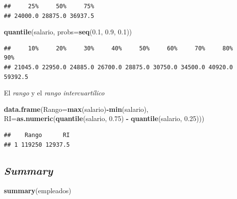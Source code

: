 \documentclass[]{book}
\newenvironment{Shaded}{\begin{snugshade}}{\end{snugshade}}
\newcommand{\DataTypeTok}[1]{\textcolor[rgb]{0.13,0.29,0.53}{#1}}
\newcommand{\FloatTok}[1]{\textcolor[rgb]{0.00,0.00,0.81}{#1}}
\newcommand{\KeywordTok}[1]{\textcolor[rgb]{0.13,0.29,0.53}{\textbf{#1}}}
\newcommand{\NormalTok}[1]{#1}
\newcommand{\OperatorTok}[1]{\textcolor[rgb]{0.81,0.36,0.00}{\textbf{#1}}}
\newcommand{\StringTok}[1]{\textcolor[rgb]{0.31,0.60,0.02}{#1}}
\begin{document}
\begin{verbatim}
##     25%     50%     75% 
## 24000.0 28875.0 36937.5
\end{verbatim}

\begin{Shaded}
\begin{Highlighting}[]
\KeywordTok{quantile}\NormalTok{(salario, }\DataTypeTok{probs=}\KeywordTok{seq}\NormalTok{(}\FloatTok{0.1}\NormalTok{, }\FloatTok{0.9}\NormalTok{, }\FloatTok{0.1}\NormalTok{))}
\end{Highlighting}
\end{Shaded}

\begin{verbatim}
##     10%     20%     30%     40%     50%     60%     70%     80%     90% 
## 21045.0 22950.0 24885.0 26700.0 28875.0 30750.0 34500.0 40920.0 59392.5
\end{verbatim}

El \emph{rango} y el \emph{rango intercuartílico}

\begin{Shaded}
\begin{Highlighting}[]
\KeywordTok{data.frame}\NormalTok{(}\DataTypeTok{Rango=}\KeywordTok{max}\NormalTok{(salario)}\OperatorTok{-}\KeywordTok{min}\NormalTok{(salario),}
           \DataTypeTok{RI=}\KeywordTok{as.numeric}\NormalTok{(}\KeywordTok{quantile}\NormalTok{(salario, }\FloatTok{0.75}\NormalTok{) }\OperatorTok{-}\StringTok{ }\KeywordTok{quantile}\NormalTok{(salario, }\FloatTok{0.25}\NormalTok{)))}
\end{Highlighting}
\end{Shaded}

\begin{verbatim}
##    Rango      RI
## 1 119250 12937.5
\end{verbatim}

\hypertarget{summary}{%
\subsection{\texorpdfstring{\emph{Summary}}{Summary}}\label{summary}}

\begin{Shaded}
\begin{Highlighting}[]
\KeywordTok{summary}\NormalTok{(empleados)}
\end{Highlighting}
\end{Shaded}
\end{document}
